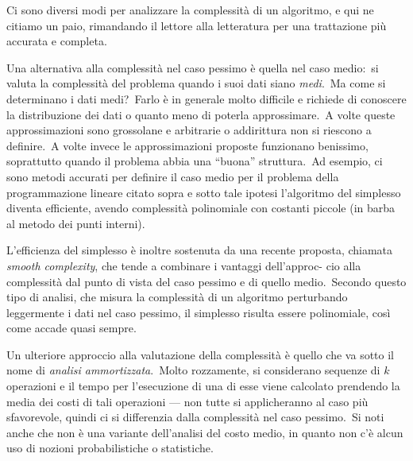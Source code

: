 Ci sono diversi modi per analizzare la complessità di un algoritmo, e qui ne citiamo un paio, rimandando il lettore alla letteratura per una trattazione più accurata e completa.

Una alternativa alla complessità nel caso pessimo è quella nel caso medio:\ si valuta la complessità del problema quando i suoi dati siano \textit{medi}.\
Ma come si determinano i dati medi?\ Farlo è in generale molto difficile e richiede di conoscere la distribuzione dei dati o quanto meno di poterla approssimare.\
A volte queste approssimazioni sono grossolane e arbitrarie o addirittura non si riescono a definire.\
A volte invece le approssimazioni proposte funzionano benissimo, soprattutto quando il problema abbia una ``buona'' struttura.\
Ad esempio, ci sono metodi accurati per definire il caso medio per il problema della programmazione lineare citato sopra e sotto tale ipotesi l'algoritmo del simplesso diventa efficiente, avendo complessità polinomiale con costanti piccole (in barba al metodo dei punti interni).\

L'efficienza del simplesso è inoltre sostenuta da una recente proposta, chiamata \textit{smooth complexity}, che tende a combinare i vantaggi dell'approc- cio alla complessità dal punto di vista del caso pessimo e di quello medio.\
Secondo questo tipo di analisi, che misura la complessità di un algoritmo perturbando leggermente i dati nel caso pessimo, il simplesso risulta essere polinomiale, così come accade quasi sempre.\

Un ulteriore approccio alla valutazione della complessità è quello che va sotto il nome di \textit{analisi ammortizzata}.\
Molto rozzamente, si considerano sequenze di $k$ operazioni e il tempo per l'esecuzione di una di esse viene calcolato prendendo la media dei costi di tali operazioni --- non tutte si applicheranno al caso più sfavorevole, quindi ci si differenzia dalla complessità nel caso pessimo.\
Si noti anche che non è una variante dell'analisi del costo medio, in quanto non c'è alcun uso di nozioni probabilistiche o statistiche.\

